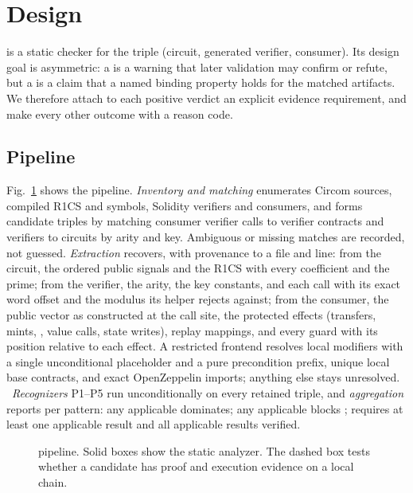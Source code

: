 \section{\tool{} Design}\label{sec:design}

\tool{} is a static checker for the triple (circuit, generated verifier,
consumer). Its design goal is asymmetric: a \VIOL{} is a warning that later
validation may confirm or refute, but a \VWS{} is a claim that a named binding
property holds for the matched artifacts. We therefore attach to each positive
verdict an explicit evidence requirement, and make every other outcome \UNK{}
with a reason code.

\subsection{Pipeline}

Fig.~\ref{fig:pipeline} shows the pipeline. \emph{Inventory and matching}
enumerates Circom sources, compiled R1CS and symbols, Solidity verifiers and
consumers, and forms candidate triples by matching consumer verifier calls to
verifier contracts and verifiers to circuits by arity and key. Ambiguous or
missing matches are recorded, not guessed. \emph{Extraction} recovers, with
provenance to a file and line: from the circuit, the ordered public signals and
the R1CS with every coefficient and the prime; from the verifier, the arity,
the key constants, and each  call with its exact word offset
and the modulus its helper rejects against; from the consumer, the public
vector as constructed at the call site, the protected effects (transfers,
mints, , value calls, state writes), replay mappings, and every
guard with its position relative to each effect. A restricted frontend resolves
local modifiers with a single unconditional placeholder and a pure precondition
prefix, unique local base contracts, and exact OpenZeppelin imports; anything
else stays unresolved.%
\
\emph{Recognizers} P1--P5 run unconditionally on every retained triple, and
\emph{aggregation} reports per pattern: any applicable \VIOL{} dominates; any
applicable \UNK{} blocks \VWS{}; \VWS{} requires at least one applicable result
and all applicable results verified.%

\begin{figure}[t]
\centering

\caption{\tool{} pipeline. Solid boxes show the static analyzer. The dashed box tests whether a candidate has proof and execution evidence on a local chain.}
\label{fig:pipeline}
\end{figure}

